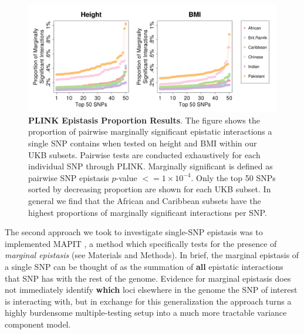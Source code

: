 \documentclass[12pt,a4paper]{article}
\begin{document}
\begin{figure}[htb]
\centering
\hspace*{-1.7cm}
\includegraphics[scale=.45]{Images/Main/InterPath_Main_Figure_PLINK_vs4_HeightBMI.png}
\caption[TBD]{\textbf{PLINK Epistasis Proportion Results}. The figure shows the proportion of pairwise marginally significant epistatic interactions a single SNP contains when tested on height and BMI within our UKB subsets. Pairwise tests are conducted exhaustively for each individual SNP through PLINK. Marginally significant is defined as pairwise SNP epistasis $p$-value $<= 1\times10^{-4}$. Only the top 50 SNPs sorted by decreasing proportion are shown for each UKB subset. In general we find that the African and Caribbean subsets have the highest proportions of marginally significant interactions per SNP.}
\label{InterPath-Main-Figure-PLINK-Proportions-HeightBMI}
\end{figure}

The second approach we took to investigate single-SNP epistasis was to implemented MAPIT \citep{Crawford2017}, a method which specifically tests for the presence of \textit{marginal epistasis} (see Materials and Methods). In brief, the marginal epistasis of a single SNP can be thought of as the summation of \textbf{all} epistatic interactions that SNP has with the rest of the genome. Evidence for marginal epistasis does not immediately identify \textbf{which} loci elsewhere in the genome the SNP of interest is interacting with, but in exchange for this generalization the approach turns a highly burdensome multiple-testing setup into a much more tractable variance component model.
\end{document}
